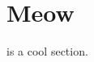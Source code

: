 \documentclass{article}
\begin{document}
\tableofcontents
\section{Meow}
\label{sec:meow}

 is a cool section.
\end{document}

